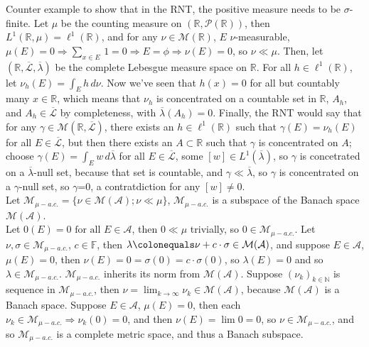 \documentclass[12pt]{article}
\newcommand{\pset}[1]{ \mathcal{P}(#1) }
\newcommand{\fall}[0] { \textrm{ for all } }
\newcommand{\nats}[0] { \mathbb{N}}
\newcommand{\reals}[0] { \mathbb{R}}
\newcommand{\A}[0] { \mathcal{A} }
\newcommand{\M}[0] { \mathcal{M} }
\newcommand{\rimply}[0] { \Rightarrow }
\newcommand{\rarw}[0] { \rightarrow }
\newcommand{ \defeq }[0] { \colonequals }
\begin{document}
Counter example to show that in the RNT, the positive measure needs to be $\sigma$-finite. Let $\mu$ be the counting measure on $(\reals, \pset{\reals})$, then $L^1(\reals, \mu) = \ell^1(\reals)$, and for any $\nu \in \M(\reals)$, $E$ $\nu$-measurable, $\mu(E) = 0 \rimply \sum_{x \in E} \, 1 = 0 \rimply E = \phi \rimply \nu(E) = 0$, so $\nu \ll \mu$. Then, let $(\reals, \overline{\mathcal{L}}, \overline{\lambda})$ be the complete Lebesgue measure space on $\reals$. For all $h \in \ell^1(\reals)$, let $\nu_h(E) = \int_E h \, d\nu$. Now we've seen that $h(x) = 0$ for all but countably many $x \in \reals$, which means that $\nu_h$ is concentrated on a countable set in $\reals$, $A_h$, and $A_h \in \overline{\mathcal{L}}$ by completeness, with $\overline{\lambda}(A_h) = 0$. Finally, the RNT would say that for any $\gamma \in \M(\reals, \overline{\mathcal{L}})$, there exists an $h \in \ell^1(\reals)$ such that $\gamma(E) = \nu_h(E)$ for all $E \in \overline{\mathcal{L}}$, but then there exists an $A \subset \reals$ such that $\gamma$ is concentrated on $A$; choose $\gamma(E) = \int_E w \, d\overline{\lambda}$ for all $E \in \overline{\mathcal{L}}$, some $[w] \in L^1(\overline{\lambda})$, so $\gamma$ is concetrated on a $\overline{\lambda}$-null set, because that set is countable, and $\gamma \ll \overline{\lambda}$, so $\gamma$ is concentrated on a $\gamma$-null set, so $\gamma$=0, a contratdiction for any $[w] \not = 0$. \\





Let $\M_{\mu-a.c.} = \{ \nu \in \M(\A); \nu \ll \mu \}$, $\M_{\mu-a.c.}$ is a subspace of the Banach space $\M(\A)$.\\

\noindent Let $0(E) = 0 \fall E \in \A$, then $0 \ll \mu$ trivially, so $ 0 \in \M_{\mu-a.c.}$. Let $\nu, \sigma \in \M_{\mu-a.c.}$, $c \in \mathbb{F}$, then $\lambda \defeq \nu + c \cdot \sigma \in \M(\A)$, and suppose $E \in \A$, $\mu(E) = 0$, then $\nu(E) = 0 = \sigma(0) = c \cdot \sigma(0)$, so $\lambda(E) = 0$ and so $\lambda \in \M_{\mu-a.c.}$. $\M_{\mu-a.c.}$ inherits its norm from $\M(\A)$. Suppose $(\nu_k)_{k \in \nats}$ is sequence in $\M_{\mu-a.c.}$, then $\nu = \lim_{k \rarw \infty} \nu_k \in \M(\A)$, because $\M(\A)$ is a Banach space. Suppose $E \in \A$, $\mu(E) = 0$, then each $\nu_k \in \M_{\mu-a.c.} \rimply \nu_k(0) = 0$, and then $\nu(E) = \lim 0 = 0$, so $\nu \in \M_{\mu-a.c.}$, and so $\M_{\mu-a.c.} $ is a complete metric space, and thus a Banach subspace.\\
\end{document}
